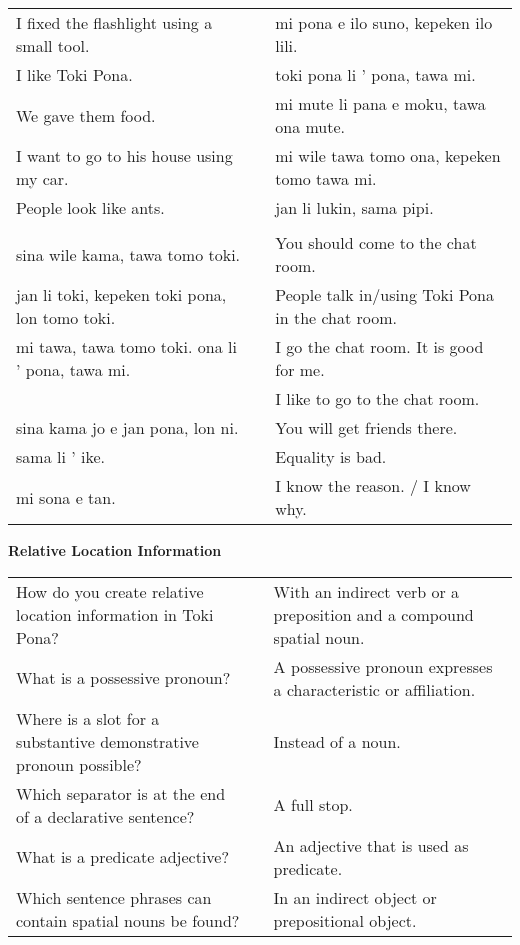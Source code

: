 \begin{supertabular}{p{5,5cm}|ll}
I fixed the flashlight using a small tool.  && mi pona e ilo suno, kepeken ilo lili. \\ %
I like Toki Pona.  && toki pona li ' pona, tawa mi. \\ %
We gave them food.  && mi mute li pana e moku, tawa ona mute. \\ %
I want to go to his house using my car.  && mi wile tawa tomo ona, kepeken tomo tawa mi. \\ %
People look like ants.  && jan li lukin, sama pipi. \\ %
&& \\ %
sina wile kama, tawa tomo toki.  && You should come to the chat room. \\
jan li toki, kepeken toki pona, lon tomo toki.  && People talk in/using Toki Pona in the chat room. \\
mi tawa, tawa tomo toki. ona li ' pona, tawa mi.  && I go the chat room. It is good for me. \\
                                         && I like to go to the chat room. \\ %
sina kama jo e jan pona, lon ni.  && You will get friends there. \\
sama li ' ike. && Equality is bad. \\
mi sona e tan. && I know the reason. / I know why. \\
\end{supertabular} 

\textbf{Relative Location Information} 
\label{'other_prepositions'}

\begin{supertabular}{p{5,5cm}|ll}
How do you create relative location information in Toki Pona? && With an indirect verb or a preposition and a compound spatial noun. \\ %
What is a possessive pronoun? && A possessive pronoun expresses a characteristic or affiliation.  \\ %
Where is a slot for a substantive demonstrative pronoun possible? && Instead of a noun. \\ %
Which separator is at the end of a declarative sentence? && A full stop. \\ %
What is a predicate adjective? && An adjective that is used as predicate. \\ %
Which sentence phrases can contain spatial nouns be found? && In an indirect object or prepositional object.  \\ %
\end{supertabular}

